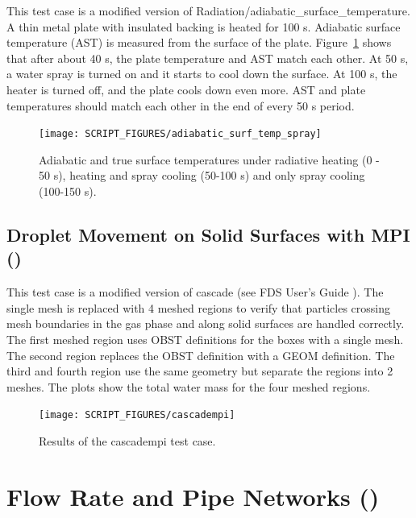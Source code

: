 \documentclass[11pt]{book}
\begin{document}
This test case is a modified version of {\ct Radiation/adiabatic\_surface\_temperature}. A thin metal plate with insulated backing is heated for 100 s. Adiabatic surface temperature (AST) is measured from the surface of the plate. Figure~\ref{adiabatic_surf_temp_spray} shows that after about 40 s, the plate temperature and AST match each other. At 50 s, a water spray is turned on and it starts to cool down the surface. At 100 s, the heater is turned off, and the plate cools down even more. AST and plate temperatures should match each other in the end of every 50 s period.
\begin{figure}[h!]
\centering
\texttt{[image: SCRIPT\_FIGURES/adiabatic\_surf\_temp\_spray]}
\caption[The {\ct adiabatic\_surface\_temperature\_spray} test case]{Adiabatic and true surface temperatures under radiative heating (0 - 50 s), heating and spray  cooling (50-100 s) and only spray cooling (100-150 s).}
\label{adiabatic_surf_temp_spray}
\end{figure}

\subsection{Droplet Movement on Solid Surfaces with MPI (\texorpdfstring{{}}{cascadempi}) }
\label{cascadempi}

This test case is a modified version of {\ct cascade} (see FDS User's Guide \cite{FDS_Users_Guide}). The single mesh is replaced with 4 meshed regions to verify that particles crossing mesh boundaries in the gas phase and along solid surfaces are handled correctly. The first meshed region uses OBST definitions for the boxes with a single mesh. The second region replaces the OBST definition with a GEOM definition. The third and fourth region use the same geometry but separate the regions into 2 meshes. The plots show the total water mass for the four meshed regions.

\begin{figure}[ht]
\centering
\texttt{[image: SCRIPT\_FIGURES/cascadempi]}
\caption[Results of the {\ct cascadempi} test case]{Results of the {\ct cascadempi} test case.}
\label{cascadempi_image}
\end{figure}



\section{Flow Rate and Pipe Networks (\texorpdfstring{{}}{flow\_rate\_2}) }
\label{flow_rate_2}
\end{document}
